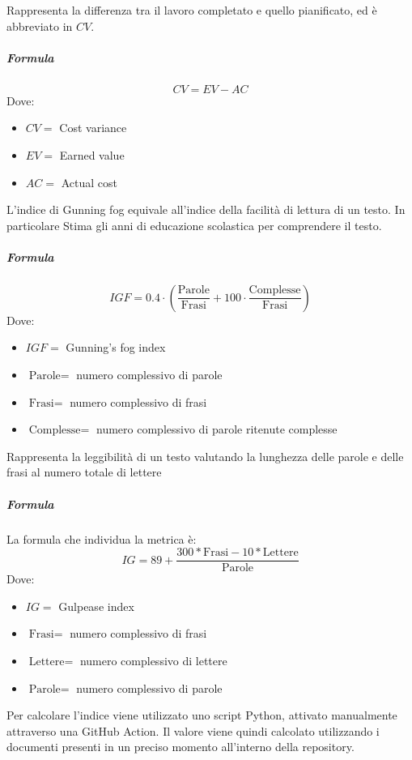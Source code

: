         
        Rappresenta la differenza tra il lavoro completato e quello pianificato, ed è abbreviato in $CV$.
        \subparagraph{Formula}
        \begin{displaymath}
          CV = EV - AC
        \end{displaymath}
        Dove:
        \begin{itemize}
            \item[] $CV =$ Cost variance
            \item[] $EV =$ Earned value
            \item[] $AC =$ Actual cost
        \end{itemize}
        
        
        L'indice di Gunning fog equivale all'indice della facilità di lettura di un testo. In particolare Stima gli anni di educazione scolastica per comprendere il testo.
        \subparagraph{Formula}
        \begin{displaymath}
          IGF = 0.4·\left(\frac{ \textrm{Parole}}{\textrm{Frasi}} + 100·  \frac{\textrm{Complesse}}{ \textrm{Frasi}}\right)
        \end{displaymath}
        Dove:
        \begin{itemize}
        \item[] $IGF =$ Gunning's fog index
        \item[] $\textrm{Parole} =$ numero complessivo di parole
        \item[] $\textrm{Frasi} =$ numero complessivo di frasi
        \item[] $\textrm{Complesse} =$ numero complessivo di parole ritenute complesse
        \end{itemize}
        
        Rappresenta la leggibilità di un testo valutando la lunghezza delle parole e delle frasi al numero totale di lettere
        \subparagraph{Formula}
        La formula che individua la metrica è:
        \begin{displaymath}
        \textit{IG} = 89 + \frac{300 * \textrm{Frasi} - 10* \textrm{Lettere}}{\textrm{Parole}}
        \end{displaymath}
        Dove:
        \begin{itemize}
        \item[] $IG =$ Gulpease index
        \item[] $\textrm{Frasi} =$ numero complessivo di frasi
        \item[] $\textrm{Lettere} =$ numero complessivo di lettere
        \item[] $\textrm{Parole} =$ numero complessivo di parole
        \end{itemize}
        Per calcolare l'indice viene utilizzato uno script Python, attivato manualmente attraverso una GitHub Action. Il valore viene quindi calcolato utilizzando i documenti presenti in un preciso momento all'interno della repository.
        
